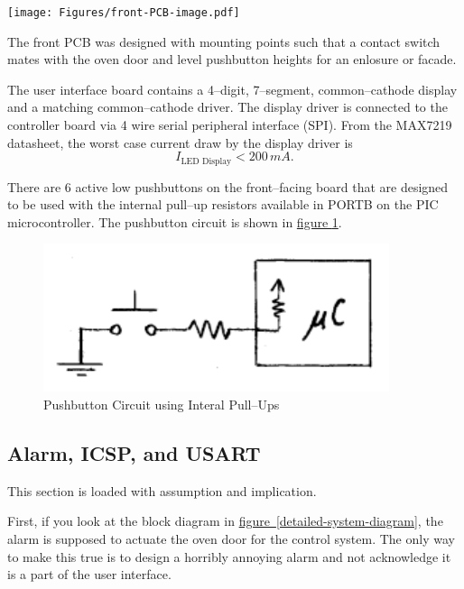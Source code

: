 \documentclass[10pt, twocolumn]{article}
\begin{document}
\begin{center}
	\texttt{[image: Figures/front-PCB-image.pdf]}
	\label{front-facing-pcb}
\end{center}

The front PCB was designed with mounting points
such that a contact switch mates with the oven door and 
level pushbutton heights for an enlosure or facade.

The user interface board contains a 4--digit, 7--segment, common--cathode
display and a matching common--cathode driver. The display driver
is connected to the controller board via 4 wire serial peripheral interface (SPI).
From the MAX7219 datasheet, the worst case current draw by the display driver
is
\begin{equation}
I_{\textrm{LED Display}}<200\,mA.
\end{equation}

There are 6 active low
pushbuttons on the front--facing board that are designed to be used
with the internal pull--up resistors available in \textrm{PORTB}
on the PIC microcontroller. The pushbutton circuit is shown in
\hyperref[pushbutton-circuit]{figure \ref{pushbutton-circuit}}.

\begin{figure}
	\centering
	\includegraphics[width=0.6\columnwidth]{Figures/pushbutton-circuit.pdf}
	\caption{Pushbutton Circuit using Interal Pull--Ups}
	\label{pushbutton-circuit}
\end{figure}

\subsection{Alarm, ICSP, and USART}

This section is loaded with assumption and implication.

First, if you look at the block diagram in
\mbox{\hyperref[detailed-system-diagram]{figure \ref{detailed-system-diagram}}},
the alarm is supposed to actuate the oven door for the control system.
The only way to make this true is to design a horribly annoying alarm
and not acknowledge it is a part of the user interface.
\end{document}

